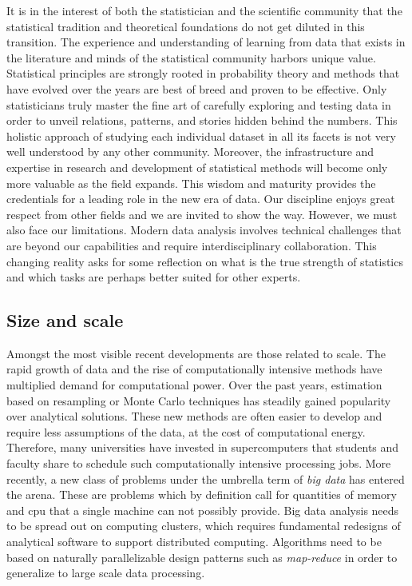 It is in the interest of both the statistician and the scientific community that the statistical tradition and theoretical foundations do not get diluted in this transition. The experience and understanding of learning from data that exists in the literature and minds of the statistical community harbors unique value. Statistical principles are strongly rooted in probability theory and methods that have evolved over the years are best of breed and proven to be effective. Only statisticians truly master the fine art of carefully exploring and testing data in order to unveil relations, patterns, and stories hidden behind the numbers. This holistic approach of studying each individual dataset in all its facets is not very well understood by any other community. Moreover, the infrastructure and expertise in research and development of statistical methods will become only more valuable as the field expands. This wisdom and maturity provides the credentials for a leading role in the new era of data. Our discipline enjoys great respect from other fields and we are invited to show the way. 
However, we must also face our limitations. Modern data analysis involves technical challenges that are beyond our capabilities and require interdisciplinary collaboration. This changing reality asks for some reflection on what is the true strength of statistics and which tasks are perhaps better suited for other experts.


\subsection{Size and scale}

Amongst the most visible recent developments are those related to scale. The rapid growth of data and the rise of computationally intensive methods have multiplied demand for computational power. Over the past years, estimation based on resampling or Monte Carlo techniques %
has steadily gained popularity over analytical solutions. 
These new methods are often easier to develop and require less assumptions of the data, at the cost of computational energy.
Therefore, many universities have invested in supercomputers that students and faculty share to schedule such computationally intensive processing jobs. More recently, a new class of problems under the umbrella term of \emph{big data} has entered the arena. These are problems which by definition call for quantities of memory and cpu that a single machine can not possibly provide. Big data analysis needs to be spread out on computing clusters, which requires fundamental redesigns of analytical software to support distributed computing. Algorithms need to be based on naturally parallelizable design patterns such as \emph{map-reduce} \citep{dean2004mapreduce} in order to generalize to large scale data processing. 

